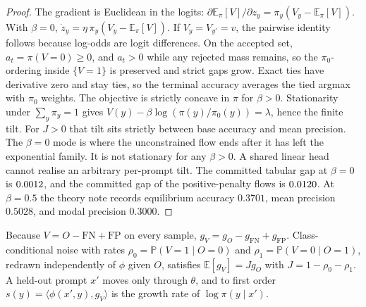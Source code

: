 \begin{proof}
The gradient is Euclidean in the logits: $\partial \mathbb{E}_\pi[V] / \partial z_y = \pi_y (V_y - \mathbb{E}_\pi[V])$.
With $\beta = 0$, $\dot z_y = \eta \, \pi_y (V_y - \mathbb{E}_\pi[V])$.
If $V_y = V_{y'} = v$, the pairwise identity follows because log-odds are logit differences.
On the accepted set, $a_t = \pi(V = 0) \ge 0$, and $a_t > 0$ while any rejected mass remains, so the $\pi_0$-ordering inside $\{V = 1\}$ is preserved and strict gaps grow.
Exact ties have derivative zero and stay ties, so the terminal accuracy averages the tied argmax with $\pi_0$ weights.
The objective is strictly concave in $\pi$ for $\beta > 0$.
Stationarity under $\sum_y \pi_y = 1$ gives $V(y) - \beta \log(\pi(y)/\pi_0(y)) = \lambda$, hence the finite tilt.
For $J > 0$ that tilt sits strictly between base accuracy and mean precision.
The $\beta = 0$ mode is where the unconstrained flow ends after it has left the exponential family.
It is not stationary for any $\beta > 0$.
A shared linear head cannot realise an arbitrary per-prompt tilt.
The committed tabular gap at $\beta = 0$ is $0.0012{}$, and the committed gap of the positive-penalty flows is $0.0120{}$.
At $\beta = 0.5$ the theory note records equilibrium accuracy $0.3701$, mean precision $0.5028$, and modal precision $0.3000$.
\end{proof}

\begin{theorem}
\label{thm:transfer}
Because $V = O - \mathrm{FN} + \mathrm{FP}$ on every sample, $g_V = g_O - g_{\mathrm{FN}} + g_{\mathrm{FP}}$.
Class-conditional noise with rates $\rho_0 = \mathbb{P}(V = 1 \mid O = 0)$ and $\rho_1 = \mathbb{P}(V = 0 \mid O = 1)$, redrawn independently of $\phi$ given $O$, satisfies $\mathbb{E}[g_V] = J g_O$ with $J = 1 - \rho_0 - \rho_1$.
A held-out prompt $x'$ moves only through $\theta$, and to first order $s(y) = \langle \phi(x', y), g_V \rangle$ is the growth rate of $\log \pi(y \mid x')$.
\end{theorem}

